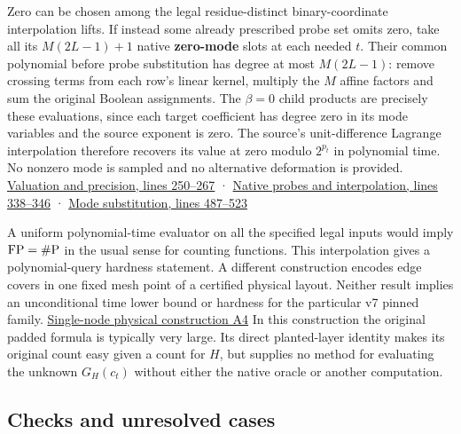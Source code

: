 \documentclass[11pt,a4paper]{article}
\begin{document}
Zero can be chosen among the legal residue-distinct binary-coordinate
interpolation lifts. If instead some already prescribed probe set omits
zero, take all its \(M(2L-1)+1\) native \textbf{zero-mode} slots at each
needed \(t\). Their common polynomial before probe substitution has
degree at most \(M(2L-1)\): remove crossing terms from each row's linear
kernel, multiply the \(M\) affine factors and sum the original Boolean
assignments. The \(\beta=0\) child products are precisely these
evaluations, since each target coefficient has degree zero in its mode
variables and the source exponent is zero. The source's unit-difference
Lagrange interpolation therefore recovers its value at zero modulo
\(2^{p_t}\) in polynomial time. No nonzero mode is sampled and no
alternative deformation is provided.
\href{https://github.com/openai/math/blob/main/preprints/The-Exponential-Time-Hypothesis-is-False-October-25-2026/build/quantitative-contraction.tex\#L250}{Valuation
and precision, lines 250--267} ·
\href{https://github.com/openai/math/blob/main/preprints/The-Exponential-Time-Hypothesis-is-False-October-25-2026/build/quantitative-contraction.tex\#L338}{Native
probes and interpolation, lines 338--346} ·
\href{https://github.com/openai/math/blob/main/preprints/The-Exponential-Time-Hypothesis-is-False-October-25-2026/build/quantitative-contraction.tex\#L487}{Mode
substitution, lines 487--523}

A uniform polynomial-time evaluator on all the specified legal inputs
would imply \({\rm FP}=\#{\rm P}\) in the usual sense for counting
functions. This interpolation gives a polynomial-query hardness
statement. A different construction encodes edge covers in one fixed
mesh point of a certified physical layout. Neither result implies an
unconditional time lower bound or hardness for the particular v7 pinned
family. \hyperref[v9-section-acquisition-cost]{Single-node physical
construction A4} In this construction the original padded formula is
typically very large. Its direct planted-layer identity makes its
original count easy given a count for \(H\), but supplies no method for
evaluating the unknown \(G_H(c_t)\) without either the native oracle or
another computation.

\subsection{Checks and unresolved
cases}\label{v9-checks-and-unresolved-cases}
\end{document}
